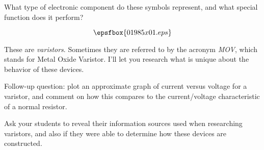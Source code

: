 

What type of electronic component do these symbols represent, and what special function does it perform?

$$\epsfbox{01985x01.eps}$$







These are {\it varistors}.  Sometimes they are referred to by the acronym {\it MOV}, which stands for Metal Oxide Varistor.  I'll let you research what is unique about the behavior of these devices.

\vskip 10pt

Follow-up question: plot an approximate graph of current versus voltage for a varistor, and comment on how this compares to the current/voltage characteristic of a normal resistor.







Ask your students to reveal their information sources used when researching varistors, and also if they were able to determine how these devices are constructed.




